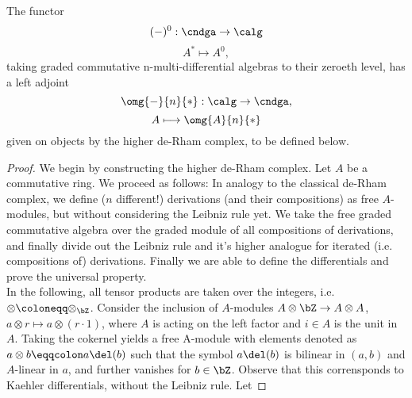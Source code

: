 %
%
\begin{prop}\label{prop_higher_de_rahm_complex}
The functor%
$$(-)^0 : \cndga \to \calg$$%
$$A^* \longmapsto A^0,$$%
taking graded commutative n-multi-differential algebras to their zeroeth level, has a left adjoint%
$$\omg{-}{n}{*}: \calg \to \cndga,$$%
$$A \longmapsto \omg{A}{n}{*}$$
given on objects by the higher de-Rham complex, to be defined below.
\begin{proof}
We begin by constructing the higher de-Rham complex. Let $A$ be a commutative ring. We proceed as follows: In analogy to the classical de-Rham complex, we define ($n$ different!) derivations (and their compositions) as free $A$-modules, but without considering the Leibniz rule yet. We take the free graded commutative algebra over the graded module of all compositions of derivations, and finally divide out the Leibniz rule and it's higher analogue for iterated (i.e. compositions of) derivations. Finally we are able to define the differentials and prove the universal property.\\
In the following, all tensor products are taken over the integers, i.e. $\otimes \coloneqq \otimes_{\bZ}$. Consider the inclusion of $A$-modules $A \otimes \bZ \to A \otimes A$, $a\otimes r \longmapsto a \otimes (r \cdot 1)$, where $A$ is acting on the left factor and $i \in A$ is the unit in $A$. Taking the cokernel yields a free A-module with elements denoted as $a\otimes b \eqqcolon a \del (b)$ such that the symbol $a \del (b)$ is bilinear in $(a,b)$ and $A$-linear in $a$, and further vanishes for $b \in \bZ$. Observe that this corrensponds to Kaehler differentials, without the Leibniz rule. Let

\end{proof}
\end{prop}
